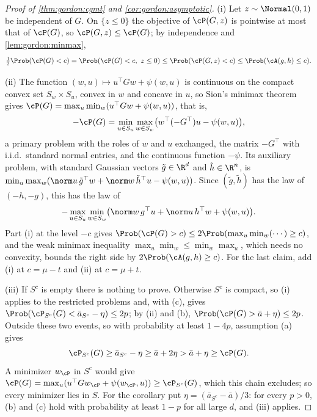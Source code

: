 \begin{refsection}
\begin{proof}[Proof of \cref{thm:gordon:cgmt} and \cref{cor:gordon:asymptotic}]
(i) Let $z\sim\Normal(0,1)$ be independent of $G$. On $\{z\le0\}$ the objective of $\cP(G,z)$ is pointwise at most that of $\cP(G)$, so $\cP(G,z)\le\cP(G)$; by independence and \cref{lem:gordon:minmax},
\[
\tfrac12\Prob(\cP(G)<c)=\Prob(\cP(G)<c,\ z\le0)\le\Prob(\cP(G,z)<c)\le\Prob(\cA(g,h)\le c).
\]

(ii) The function $(w,u)\mapsto u^\top Gw+\psi(w,u)$ is continuous on the compact convex set $S_w\times S_u$, convex in $w$ and concave in $u$, so Sion's minimax theorem \parencite{Sion1958} gives $\cP(G)=\max_u\min_w(u^\top Gw+\psi(w,u))$, that is,
\[
-\cP(G)=\min_{u\in S_u}\max_{w\in S_w}\bigl(w^\top(-G^\top)u-\psi(w,u)\bigr),
\]
a primary problem with the roles of $w$ and $u$ exchanged, the matrix $-G^\top$ with i.i.d.\ standard normal entries, and the continuous function $-\psi$. Its auxiliary problem, with standard Gaussian vectors $\tilde g\in\R^d$ and $\tilde h\in\R^n$, is $\min_u\max_w(\norm u\,\tilde g^\top w+\norm w\,\tilde h^\top u-\psi(w,u))$. Since $(\tilde g,\tilde h)$ has the law of $(-h,-g)$, this has the law of
\[
-\max_{u\in S_u}\min_{w\in S_w}\bigl(\norm w\,g^\top u+\norm u\,h^\top w+\psi(w,u)\bigr).
\]
Part (i) at the level $-c$ gives $\Prob(\cP(G)>c)\le2\Prob(\max_u\min_w(\cdots)\ge c)$, and the weak minimax inequality $\max_u\min_w\le\min_w\max_u$, which needs no convexity, bounds the right side by $2\Prob(\cA(g,h)\ge c)$. For the last claim, add (i) at $c=\mu-t$ and (ii) at $c=\mu+t$.

(iii) If $S^c$ is empty there is nothing to prove. Otherwise $S^c$ is compact, so (i) applies to the restricted problems and, with (c), gives $\Prob(\cP_{S^c}(G)<\bar a_{S^c}-\eta)\le2p$; by (ii) and (b), $\Prob(\cP(G)>\bar a+\eta)\le2p$. Outside these two events, so with probability at least $1-4p$, assumption (a) gives
\[
\cP_{S^c}(G)\ge\bar a_{S^c}-\eta\ge\bar a+2\eta>\bar a+\eta\ge\cP(G).
\]
A minimizer $w_{\cP}$ in $S^c$ would give $\cP(G)=\max_u(u^\top Gw_{\cP}+\psi(w_{\cP},u))\ge\cP_{S^c}(G)$, which this chain excludes; so every minimizer lies in $S$. For the corollary put $\eta=(\bar a_{S^c}-\bar a)/3$: for every $p>0$, (b) and (c) hold with probability at least $1-p$ for all large $d$, and (iii) applies.
\end{proof}


\end{refsection}
